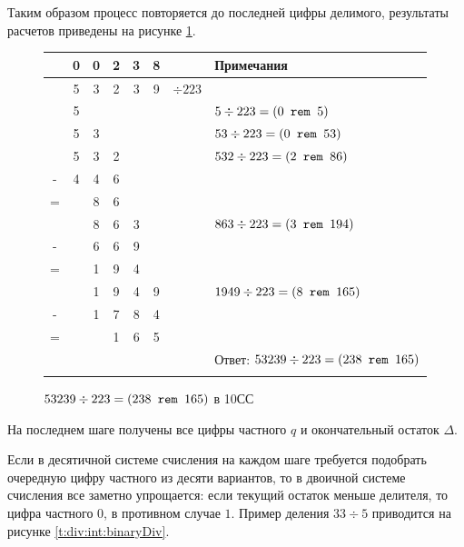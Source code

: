 Таким образом процесс повторяется до последней цифры делимого, результаты расчетов приведены на рисунке \ref{t:div:int:decimalDiv}.
\begin{figure}[!ht]
    \centering
    \begin{tabular}{cccccc|cl}
           
          & 0 & 0 & 2 & 3 & 8 &              & Примечания\\ 
          \hline\hline
          & 5 & 3 & 2 & 3 & 9 & ${\div 223}$ &\\
          \hline\hline
          & 5 &   &   &   &   &              & $5\div 223 = (\texttt{$0$ rem $5$})$   \\ \hline
          & 5 & 3 &   &   &   &              & $53\div 223 = (\texttt{$0$ rem $53$})$ \\ \hline
          & 5 & 3 & 2 &   &   &              & $532\div 223 = (\texttt{$2$ rem $86$})$ \\ 
        - & 4 & 4 & 6 &   &   &              & \\ \cline{2-4}
        = &   & 8 & 6 &   &   &              & \\ \hline
          &   & 8 & 6 & 3 &   &              & $863\div 223 = (\texttt{$3$ rem $194$})$\\ 
        - &   & 6 & 6 & 9 &   &              & \\ \cline{3-5}
        = &   & 1 & 9 & 4 &   &              & \\ \hline
          &   & 1 & 9 & 4 & 9 &              & $1949\div 223 = (\texttt{$8$ rem $165$})$\\ 
        - &   & 1 & 7 & 8 & 4 &              & \\ \cline{4-6}
        = &   &   & 1 & 6 & 5 &              & \\ \hline
          &   &   &   &   &   &              & Ответ: $53239\div 223 = (\texttt{$238$ rem $165$})$ \\ 
          \\
    \end{tabular}
	
    \caption{$53239\div 223 = (\texttt{$238$ rem $165$})$ в 10СС}
    \label{t:div:int:decimalDiv}
\end{figure}

На последнем шаге получены все цифры частного $q$ и окончательный остаток $\Delta$. 

Если в десятичной системе счисления на каждом шаге требуется подобрать очередную цифру частного из десяти вариантов, то в двоичной системе счисления все заметно упрощается: если текущий остаток меньше делителя, то цифра частного $0$, в противном случае $1$. Пример деления $33\div 5$ приводится на рисунке \ref{t:div:int:binaryDiv}.

